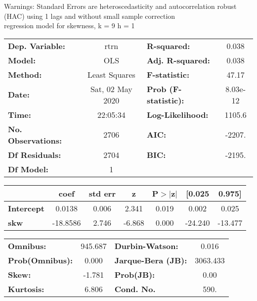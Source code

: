 Warnings: \newline
 [1] Standard Errors are heteroscedasticity and autocorrelation robust (HAC) using 1 lags and without small sample correction\\ 

regression model for skewness, k = 9 h = 1\begin{center}
\begin{tabular}{lclc}
\toprule
\textbf{Dep. Variable:}    &       rtrn       & \textbf{  R-squared:         } &     0.038   \\
\textbf{Model:}            &       OLS        & \textbf{  Adj. R-squared:    } &     0.038   \\
\textbf{Method:}           &  Least Squares   & \textbf{  F-statistic:       } &     47.17   \\
\textbf{Date:}             & Sat, 02 May 2020 & \textbf{  Prob (F-statistic):} &  8.03e-12   \\
\textbf{Time:}             &     22:05:34     & \textbf{  Log-Likelihood:    } &    1105.6   \\
\textbf{No. Observations:} &        2706      & \textbf{  AIC:               } &    -2207.   \\
\textbf{Df Residuals:}     &        2704      & \textbf{  BIC:               } &    -2195.   \\
\textbf{Df Model:}         &           1      & \textbf{                     } &             \\
\bottomrule
\end{tabular}
\begin{tabular}{lcccccc}
                   & \textbf{coef} & \textbf{std err} & \textbf{z} & \textbf{P$> |$z$|$} & \textbf{[0.025} & \textbf{0.975]}  \\
\midrule
\textbf{Intercept} &       0.0138  &        0.006     &     2.341  &         0.019        &        0.002    &        0.025     \\
\textbf{skw}       &     -18.8586  &        2.746     &    -6.868  &         0.000        &      -24.240    &      -13.477     \\
\bottomrule
\end{tabular}
\begin{tabular}{lclc}
\textbf{Omnibus:}       & 945.687 & \textbf{  Durbin-Watson:     } &    0.016  \\
\textbf{Prob(Omnibus):} &   0.000 & \textbf{  Jarque-Bera (JB):  } & 3063.433  \\
\textbf{Skew:}          &  -1.781 & \textbf{  Prob(JB):          } &     0.00  \\
\textbf{Kurtosis:}      &   6.806 & \textbf{  Cond. No.          } &     590.  \\
\bottomrule
\end{tabular}
\end{center}

